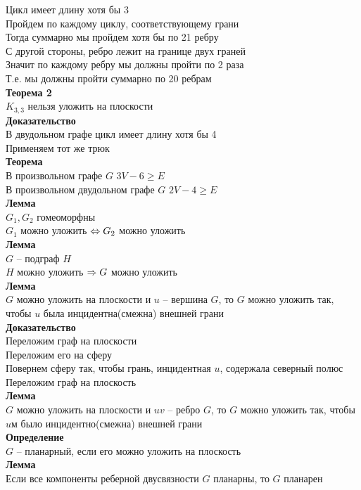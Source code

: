 \documentclass[12pt]{article}
\begin{document}
Цикл имеет длину хотя бы 3\\
Пройдем по каждому циклу, соответствующему грани\\
Тогда суммарно мы пройдем хотя бы по 21 ребру\\
С другой стороны, ребро лежит на границе двух граней\\
Значит по каждому ребру мы должны пройти по 2 раза\\
Т.е. мы должны пройти суммарно по 20 ребрам\\
\textbf{Теорема 2}\\
$K_{3,3}$ нельзя уложить на плоскости\\
\textbf{Доказательство}\\
В двудольном графе цикл имеет длину хотя бы 4\\
Применяем тот же трюк\\
\textbf{Теорема}\\
В произвольном графе $G$ $3V - 6 \geq E$\\
В произвольном двудольном графе $G$ $2V - 4 \geq E$\\
\textbf{Лемма}\\
$G_1, G_2$ гомеоморфны\\
$G_1$ можно уложить $\Leftrightarrow G_2$ можно уложить\\
\textbf{Лемма}\\
$G$ -- подграф $H$\\
$H$ можно уложить $\Rightarrow G$ можно уложить\\
\textbf{Лемма}\\
$G$ можно уложить на плоскости и $u$ -- вершина $G$, то $G$ можно уложить так, чтобы $u$ была инцидентна(смежна) внешней грани\\
\textbf{Доказательство}\\
Переложим граф на плоскости\\
Переложим его на сферу\\
Повернем сферу так, чтобы грань, инцидентная $u$, содержала северный полюс\\
Переложим граф на плоскость\\
\textbf{Лемма}\\
$G$ можно уложить на плоскости и $uv$ -- ребро $G$, то $G$ можно уложить так, чтобы $uм$ было инцидентно(смежна) внешней грани\\
\textbf{Определение}\\
$G$ -- планарный, если его можно уложить на плоскость\\
\textbf{Лемма}\\
Если все компоненты реберной двусвязности $G$ планарны, то $G$ планарен\\
\end{document}
